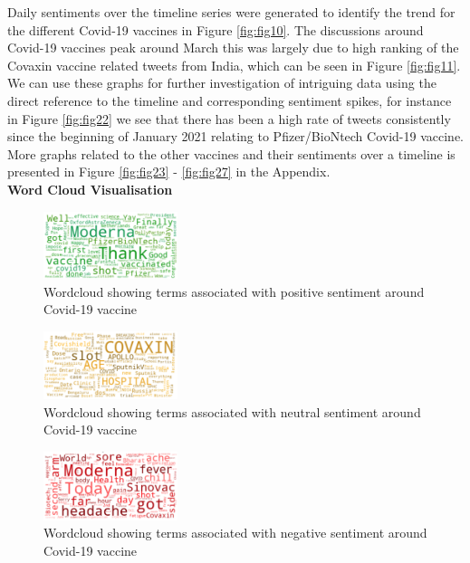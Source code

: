 \documentclass[conference]{IEEEtran}
\begin{document}
Daily sentiments over the timeline series  were generated to identify the trend for the different Covid-19 vaccines in Figure \ref{fig:fig10}. The discussions around Covid-19 vaccines peak around March this was largely due to high ranking of the Covaxin vaccine related tweets from India, which can be seen in Figure \ref{fig:fig11}. We can use these graphs for further investigation of intriguing data using the direct reference to the timeline and corresponding sentiment spikes, for instance in Figure \ref{fig:fig22} we see that there has been a high rate of tweets consistently since the beginning of January 2021 relating to Pfizer/BioNtech Covid-19 vaccine. More graphs related to the other vaccines and their sentiments over a timeline is presented in Figure \ref{fig:fig23} - \ref{fig:fig27} in the Appendix.\\


 \textbf{Word Cloud Visualisation}
 
 
\begin{figure}[h]
\centering
\includegraphics[width=0.35\textwidth]{positivecloud.png}
\caption{Wordcloud showing terms associated with positive sentiment around Covid-19 vaccine}
\label{fig:fig7}
\end{figure} 


\begin{figure}[h]
\centering
\includegraphics[width=0.35\textwidth]{neutralcloud.png}
\caption{Wordcloud showing terms associated with neutral sentiment around Covid-19 vaccine}
\label{fig:fig8}
\end{figure} 

\begin{figure}[h]
\centering
\includegraphics[width=0.35\textwidth]{negativecloud.png}
\caption{Wordcloud showing terms associated with negative sentiment around Covid-19 vaccine}
\label{fig:fig9}
\end{figure}  
 
\end{document}
